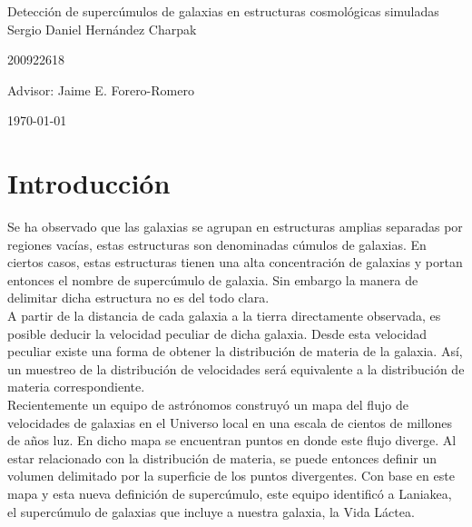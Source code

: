 \documentclass[12pt]{article}
\begin{document}
\begin{center}
\Huge
Detecci\'on de superc\'{u}mulos de galaxias en estructuras
cosmol\'{o}gicas simuladas\\  
\vspace{3mm}
\Large Sergio Daniel Hern\'{a}ndez Charpak

\large
200922618

\vspace{2mm}
\Large
Advisor: Jaime E. Forero-Romero

\normalsize
\vspace{2mm}

\today
\end{center}


\normalsize
\section{Introducci\'{o}n}
Se ha observado que las galaxias se agrupan en estructuras amplias separadas por regiones vac\'{i}as, estas estructuras son denominadas c\'{u}mulos de galaxias. En ciertos casos, estas estructuras tienen una alta concentraci\'{o}n de galaxias y portan entonces el nombre de superc\'{u}mulo de galaxia. Sin embargo la manera de delimitar dicha estructura no es del todo clara\cite{gott_iii_map_2005}.
\\

A partir de la distancia de cada galaxia a la tierra directamente observada, es posible deducir la velocidad peculiar de dicha galaxia. Desde esta velocidad peculiar existe una forma de obtener la distribuci\'{o}n de materia de la galaxia. As\'{i}, un muestreo de la distribuci\'{o}n de velocidades ser\'{a} equivalente a la distribuci\'{o}n de materia correspondiente.
\\

Recientemente un equipo de astr\'{o}nomos construy\'o un mapa del flujo
de velocidades de galaxias en el Universo local en una escala de
cientos de millones de a\~nos luz\cite{tully_cosmicflows-2_2013}. En dicho mapa se encuentran puntos en donde este flujo diverge. Al estar relacionado con la distribuci\'{o}n de materia, se puede entonces definir un volumen delimitado por la superficie de los puntos divergentes. 
Con base en este mapa y esta nueva definici\'{o}n de superc\'{u}mulo, este equipo identific\'{o} a Laniakea, el superc\'umulo de galaxias que
incluye a nuestra galaxia, la Vida L\'{a}ctea\cite{tully_laniakea_2014}.
\\  
\end{document}
